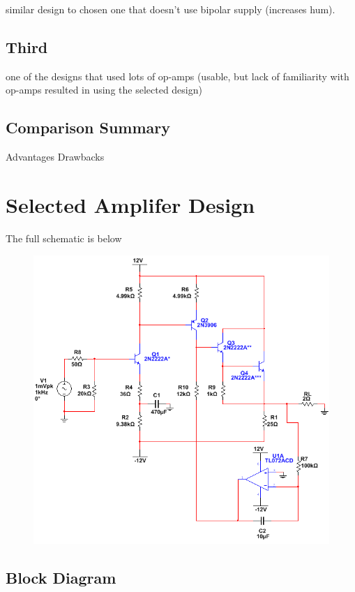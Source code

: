 \documentclass[journal]{IEEEtran}
\begin{document}
similar design to chosen one that doesn't use bipolar supply (increases hum). 

\subsection{Third}

one of the designs that used lots of op-amps (usable, but lack of familiarity with op-amps resulted in using the selected design)

\subsection{Comparison Summary}

Advantages Drawbacks 

\section{Selected Amplifer Design}

The full schematic is below

\begin{figure}[H]
\centering
\includegraphics[scale=.4]{final-schem.png}
\label{fig_amp_schem}
\end{figure}

\subsection{Block Diagram}
\end{document}
